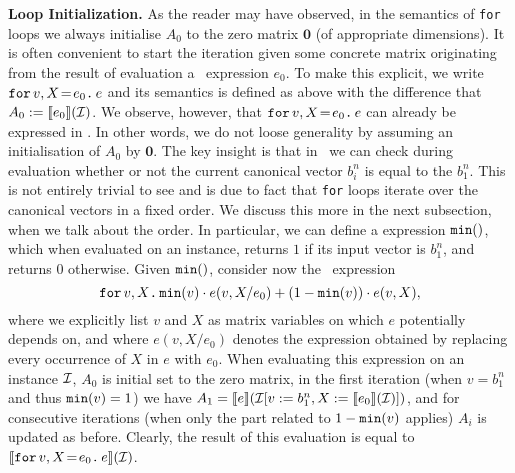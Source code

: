 \noindent\textbf{Loop Initialization.} As the reader may have observed, in the semantics of \texttt{for} loops we 
always initialise $A_0$ to the zero matrix $\mathbf{0}$ (of appropriate dimensions). It is often convenient
to start the iteration given some concrete matrix  originating from the result of evaluation a \langfor\ expression $e_0$. To make this explicit, we write $\initf{e_0}{v}{X}{e}$ and its semantics is defined as above
with the difference that $A_0:=\sem{e_0}{\I}$. We observe, however, that $\initf{e_0}{v}{X}{e}$ can already
be expressed in \langfor. In other words, we do not loose generality by assuming an initialisation of $A_0$ by $\mathbf{0}$.
The key insight is that in \langfor\ we can check during evaluation whether or not
the current canonical vector $b_i^n$ is equal to the $b_1^n$. This is not entirely trivial to see and is due to fact that \texttt{for} loops iterate over the canonical vectors in a fixed order. We discuss this more in the next subsection, when we talk about the order. In particular, we can define a \langfor expression $\mmin$, which when evaluated on an instance, returns $1$ if its input vector is $b_1^n$, and returns $0$ otherwise. Given $\mmin$, consider now the
\langfor\ expression
 $$\ffor{v}{X}{\mmin{v}\cdot e(v,X/e_0) + (1-\mmin{v})\cdot e(v,X)},$$
 where we explicitly list $v$ and $X$ as matrix variables on which $e$ potentially depends on, and where
 $e(v,X/e_0)$ denotes the expression obtained by replacing every occurrence of $X$ in $e$ with $e_0$.
%
When evaluating this expression on an instance $\I$, $A_0$ is initial set to the zero matrix, in the first iteration (when  $v=b_1^n$ and thus $\mmin{v}=1$)
we have $A_1=\sem{e}{\I[v:=b_1^n,X:=\sem{e_0}{\I}]}$, and for consecutive iterations (when only the part related to $1-\mmin{v}$ applies) $A_i$ is updated as before. Clearly, the result of this evaluation is equal to
$\sem{\initf{e_0}{v}{X}{e}}{\I}$. 

